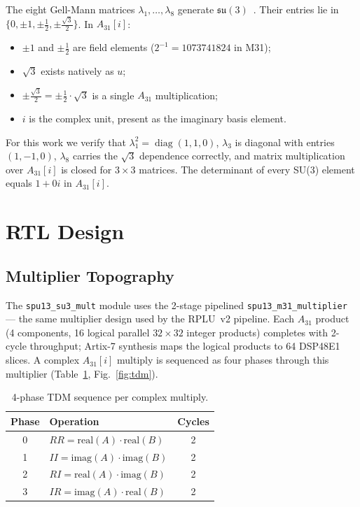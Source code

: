 \documentclass[conference]{IEEEtran}
\begin{document}
The eight Gell-Mann matrices $\lambda_1,\dots,\lambda_8$ generate
$\mathfrak{su}(3)$~\cite{gellmann1962}. Their entries lie in
$\{0, \pm1, \pm\tfrac{1}{2}, \pm\tfrac{\sqrt{3}}{2}\}$. In $A_{31}[i]$:
\begin{itemize}
\item $\pm1$ and $\pm\tfrac{1}{2}$ are field elements
      ($2^{-1} = 1073741824$ in M31);
\item $\sqrt{3}$ exists natively as $u$;
\item $\pm\tfrac{\sqrt{3}}{2} = \pm\tfrac{1}{2}\cdot\sqrt{3}$ is a single
      $A_{31}$ multiplication;
\item $i$ is the complex unit, present as the imaginary basis element.
\end{itemize}
For this work we verify that $\lambda_1^2 = \operatorname{diag}(1,1,0)$,
$\lambda_3$ is diagonal with entries $(1,-1,0)$, $\lambda_8$ carries the
$\sqrt{3}$ dependence correctly, and matrix multiplication over $A_{31}[i]$
is closed for $3\times3$ matrices. The determinant of every SU(3) element
equals $1 + 0i$ in $A_{31}[i]$.

\section{RTL Design}

\subsection{Multiplier Topography}

The \texttt{spu13\_su3\_mult} module uses the 2-stage pipelined
\texttt{spu13\_m31\_multiplier} --- the same multiplier design used by the
RPLU~v2 pipeline. Each $A_{31}$ product (4 components, 16 logical parallel
$32\times32$ integer products) completes with 2-cycle throughput; Artix-7
synthesis maps the logical products to 64 DSP48E1 slices. A complex
$A_{31}[i]$ multiply is sequenced as four phases through this multiplier
(Table~\ref{tab:phases}, Fig.~\ref{fig:tdm}).

\begin{table}[ht]
\centering
\caption{4-phase TDM sequence per complex multiply.}
\label{tab:phases}
\begin{tabular}{clc}
\toprule
Phase & Operation & Cycles \\
\midrule
0 & $RR = \mathrm{real}(A)\cdot\mathrm{real}(B)$ & 2 \\
1 & $II = \mathrm{imag}(A)\cdot\mathrm{imag}(B)$ & 2 \\
2 & $RI = \mathrm{real}(A)\cdot\mathrm{imag}(B)$ & 2 \\
3 & $IR = \mathrm{imag}(A)\cdot\mathrm{real}(B)$ & 2 \\
\bottomrule
\end{tabular}
\end{table}
\end{document}
